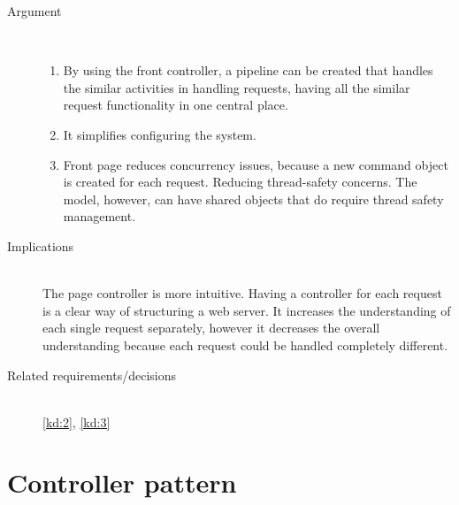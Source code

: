 \begin{description}
\item [Argument]~\\
\begin{enumerate}
\item By using the front controller, a pipeline can be created that handles the similar activities in handling requests, having all the similar request functionality in one central place.
\item It simplifies configuring the system.
\item Front page reduces concurrency issues, because a new command object is created for each request. Reducing thread-safety concerns. The model, however, can have shared objects that do require thread safety management.
\end{enumerate}

\item [Implications]~\\
The page controller is more intuitive. Having a controller for each request is a clear way of structuring a web server. It increases the understanding of each single request separately, however it decreases the overall understanding because each request could be handled completely different.

\item [Related requirements/decisions]~\\
\ref{kd:2}, \ref{kd:3}

\end{description}

\section{Controller pattern}
%
